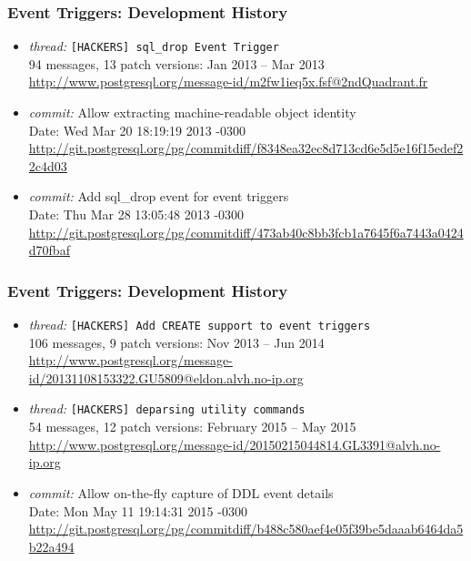 \frame
{ \frametitle{Event Triggers: Development History}
\begin{itemize}

\item 
\textit{thread:} \texttt{[HACKERS] sql\_drop Event Trigger} \\
94 messages, 13 patch versions: Jan 2013 -- Mar 2013 \\
{\tiny \url{http://www.postgresql.org/message-id/m2fw1ieq5x.fsf@2ndQuadrant.fr}}

\item \textit{commit:}
Allow extracting machine-readable object identity \\
Date: Wed Mar 20 18:19:19 2013 -0300
{\tiny \url{http://git.postgresql.org/pg/commitdiff/f8348ea32ec8d713cd6e5d5e16f15edef22c4d03}}

\item \textit{commit:}
Add sql\_drop event for event triggers \\
Date: Thu Mar 28 13:05:48 2013 -0300 \\
{\tiny \url{http://git.postgresql.org/pg/commitdiff/473ab40c8bb3fcb1a7645f6a7443a0424d70fbaf}}

\end{itemize}
}


\frame
{ \frametitle{Event Triggers: Development History}
\begin{itemize}

\item 
\textit{thread:} \texttt{[HACKERS] Add CREATE support to event triggers} \\
106 messages, 9 patch versions: Nov 2013 -- Jun 2014 \\
{\tiny \url{http://www.postgresql.org/message-id/20131108153322.GU5809@eldon.alvh.no-ip.org}}

\item 
\textit{thread:} \texttt{[HACKERS] deparsing utility commands} \\
54 messages, 12 patch versions: February 2015 -- May 2015 \\
{\tiny \url{http://www.postgresql.org/message-id/20150215044814.GL3391@alvh.no-ip.org}}

\item \textit{commit:}
Allow on-the-fly capture of DDL event details \\
Date: Mon May 11 19:14:31 2015 -0300 \\
{\tiny \url{http://git.postgresql.org/pg/commitdiff/b488c580aef4e05f39be5daaab6464da5b22a494}}

\end{itemize}
}


